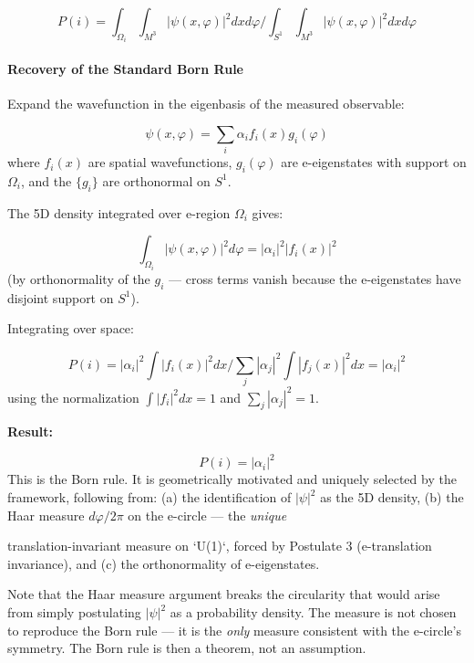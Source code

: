 \documentclass[aps,prd,preprint,superscriptaddress,longbibliography,floatfix]{revtex4-2}
\theoremstyle{remark}
\begin{document}
\begin{equation}
    P(i) = \int_{\Omega_{i}} \int_{M^{3}} |\psi(x, \varphi)|^{2} dx d\varphi  /  \int_{S^{1}} \int_{M^{3}} |\psi(x, \varphi)|^{2} dx d\varphi
\end{equation}

\paragraph{Recovery of the Standard Born Rule}

Expand the wavefunction in the eigenbasis of the measured observable:


\begin{equation}
    \psi(x, \varphi) = \sum_i \alpha_{i} f_{i}(x) g_{i}(\varphi)
\end{equation}
where $f_{i}(x)$ are spatial wavefunctions, $g_{i}(\varphi)$ are e-eigenstates with support on $\Omega_{i}$, and the $\{g_{i}\}$ are orthonormal on $S^{1}$.

The 5D density integrated over e-region $\Omega_{i}$ gives:


\begin{equation}
    \int_{\Omega_{i}} |\psi(x, \varphi)|^{2} d\varphi = |\alpha_{i}|^{2} |f_{i}(x)|^{2}
\end{equation}
(by orthonormality of the $g_{i}$ --- cross terms vanish because the e-eigenstates have disjoint support on $S^{1}$).

Integrating over space:


\begin{equation}
    P(i) = |\alpha_{i}|^{2} \int|f_{i}(x)|^{2} dx / \sum_j |\alpha_{j}|^{2} \int|f_{j}(x)|^{2} dx = |\alpha_{i}|^{2}
\end{equation}
using the normalization $\int|f_{i}|^{2} dx = 1$ and $\sum_{j}|\alpha_{j}|^{2} = 1$.

\textbf{Result:}


\begin{equation}
    P(i) = |\alpha_{i}|^{2}
\end{equation}
This is the Born rule. It is geometrically motivated and uniquely selected by the framework, following from: (a) the identification of $|\psi|^{2}$ as the 5D density, (b) the Haar measure $d\varphi/2\pi$ on the e-circle --- the \textit{unique}

translation-invariant measure on `U(1)`, forced by Postulate 3
(e-translation invariance), and
(c) the orthonormality of e-eigenstates.

Note that the Haar measure argument breaks the circularity that would arise from simply postulating $|\psi|^{2}$ as a probability density. The measure is not chosen to reproduce the Born rule --- it is the \textit{only} measure consistent with the e-circle's symmetry. The Born rule is then a theorem, not an assumption.
\end{document}
